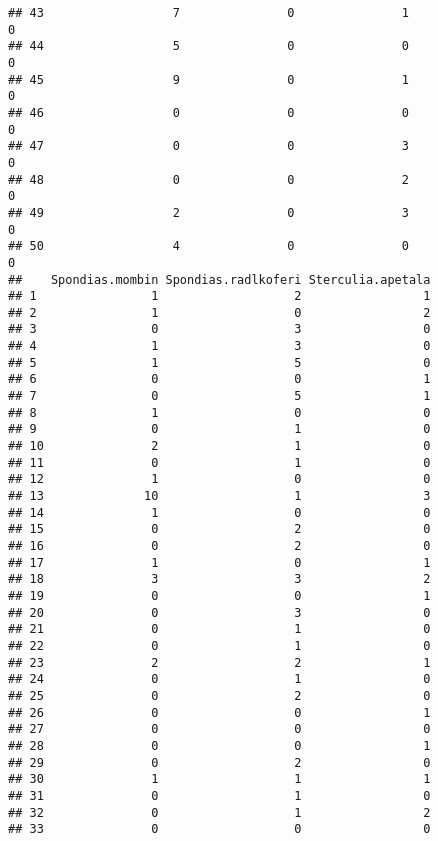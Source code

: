 \documentclass[
]{article}
\begin{document}
\begin{verbatim}
## 43                  7               0               1                   0
## 44                  5               0               0                   0
## 45                  9               0               1                   0
## 46                  0               0               0                   0
## 47                  0               0               3                   0
## 48                  0               0               2                   0
## 49                  2               0               3                   0
## 50                  4               0               0                   0
##    Spondias.mombin Spondias.radlkoferi Sterculia.apetala
## 1                1                   2                 1
## 2                1                   0                 2
## 3                0                   3                 0
## 4                1                   3                 0
## 5                1                   5                 0
## 6                0                   0                 1
## 7                0                   5                 1
## 8                1                   0                 0
## 9                0                   1                 0
## 10               2                   1                 0
## 11               0                   1                 0
## 12               1                   0                 0
## 13              10                   1                 3
## 14               1                   0                 0
## 15               0                   2                 0
## 16               0                   2                 0
## 17               1                   0                 1
## 18               3                   3                 2
## 19               0                   0                 1
## 20               0                   3                 0
## 21               0                   1                 0
## 22               0                   1                 0
## 23               2                   2                 1
## 24               0                   1                 0
## 25               0                   2                 0
## 26               0                   0                 1
## 27               0                   0                 0
## 28               0                   0                 1
## 29               0                   2                 0
## 30               1                   1                 1
## 31               0                   1                 0
## 32               0                   1                 2
## 33               0                   0                 0

\end{verbatim}
\end{document}
